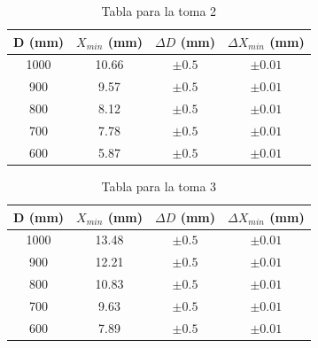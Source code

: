 \documentclass[11pt, a4paper, twocolumn]{article}
\begin{document}
\begin{table}[H]
    \caption{Tabla para la toma 2 }
    \centering
    \small
    \setlength{\tabcolsep}{4pt}
    \begin{tabular}{cccc}
        \hline
        D (mm) &   $X_{min}$ (mm) & $\Delta D$ (mm) & $\Delta X_{min}$ (mm)  \\
        \hline
            1000 &       10.66 & $\pm 0.5$        & $\pm 0.01$ \\
            900 &        9.57 & $\pm 0.5$        & $\pm 0.01$ \\
            800 &        8.12 & $\pm 0.5$        & $\pm 0.01$ \\
            700 &        7.78 & $\pm 0.5$        & $\pm 0.01$ \\
            600 &        5.87 & $\pm 0.5$        & $\pm 0.01$ \\
        \hline
    \end{tabular}
\end{table}


\vspace{0.5cm}

\begin{table}[H]
    \caption{Tabla para la toma 3 }
    \centering
    \small
    \setlength{\tabcolsep}{4pt}
    \begin{tabular}{cccc}
        \hline
        D (mm) &   $X_{min}$ (mm) & $\Delta D$ (mm) & $\Delta X_{min}$ (mm)  \\
        \hline
            1000 &       13.48 & $\pm 0.5$        & $\pm 0.01$ \\
            900 &       12.21 & $\pm 0.5$        & $\pm 0.01$ \\
            800 &       10.83 & $\pm 0.5$        & $\pm 0.01$ \\
            700 &        9.63 & $\pm 0.5$        & $\pm 0.01$ \\
            600 &        7.89 & $\pm 0.5$        & $\pm 0.01$ \\
        \hline
    \end{tabular}

\end{table}

\vspace{0.5cm}
\end{document}
